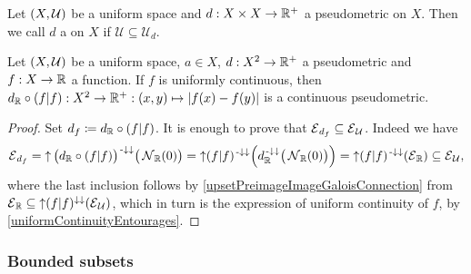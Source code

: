 \begin{definition}
Let $\sSet{X, \mathcal{U}}$ be a uniform space and $d: X\times X\to \mathbb{R}^+$ a pseudometric on $X$. Then we call $d$ a  on $X$ if $\mathcal{U}\subseteq \mathcal{U}_d$.
\end{definition}

\begin{proposition} \label{continuousPseudometricFunctionLemma}
Let $\sSet{X, \mathcal{U}}$ be a uniform space, $a\in X$, $d: X^2\to \mathbb{R}^+$ a pseudometric and $f: X\to \mathbb{R}$ a function.
If $f$ is uniformly continuous, then $d_{\mathbb{R}}\circ (f|f): X^2\to \mathbb{R}^+: (x,y)\mapsto |f(x)- f(y)|$ is a continuous pseudometric.
\end{proposition}
\begin{proof}
Set $d_f \coloneqq d_{\mathbb{R}}\circ(f|f)$. It is enough to prove that $\operatorname{\mathcal{E}}_{d_f}\subseteq \operatorname{\mathcal{E}}_\mathcal{U}$. Indeed we have
\[ \operatorname{\mathcal{E}}_{d_f} = \operatorname{\uparrow} \big(d_{\mathbb{R}}\circ (f|f)\big)^{{\text{\hspace{0.15em}-}\downarrow}\downarrow}\big(\operatorname{\mathcal{N}}_{\mathbb{R}}(0)\big) = \operatorname{\uparrow} (f|f)^{{\text{\hspace{0.15em}-}\downarrow}\downarrow}\Big(d_{\mathbb{R}}^{{\text{\hspace{0.15em}-}\downarrow}\downarrow}\big(\operatorname{\mathcal{N}}_{\mathbb{R}}(0)\big)\Big) = \operatorname{\uparrow} (f|f)^{{\text{\hspace{0.15em}-}\downarrow}\downarrow}(\operatorname{\mathcal{E}}_{\mathbb{R}}) \subseteq \operatorname{\mathcal{E}}_\mathcal{U}, \]
where the last inclusion follows by \ref{upsetPreimageImageGaloisConnection} from $\operatorname{\mathcal{E}}_{\mathbb{R}} \subseteq \operatorname{\uparrow} (f|f)^{\downarrow\downarrow}(\operatorname{\mathcal{E}}_\mathcal{U})$, which in turn is the expression of uniform continuity of $f$, by \ref{uniformContinuityEntourages}.
\end{proof}

\subsubsection{Bounded subsets}

